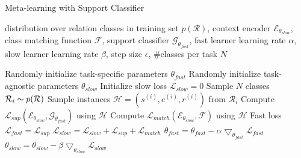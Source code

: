 \begin{algorithm}[th]
\small
\caption{Meta-learning with Support Classifier}\label{alg:metal}
distribution over relation classes in training set $p(\mathcal{R})$,
context encoder $\mathcal{E}_{\theta_{slow}}$,
class matching function $\mathcal{F}$,
support classifier $\mathcal{G}_{\theta_{fast}}$,
fast learner learning rate $\alpha$,
slow learner learning rate $\beta$,
step size $\epsilon$, \#classes per task $N$
\begin{algorithmic}[1]
\STATE Randomly initialize task-specific parameters $\theta_{fast}$
\STATE Randomly initialize task-agnostic parameters $\theta_{slow}$
\STATE Initialize slow loss $\mathcal{L}_{slow}=0$
\STATE Sample $N$ classes $\mathcal{R}_i \thicksim p(\mathcal{R})$
\label{sampler}
\STATE Sample instances $\mathcal{H}=(s^{(i)}, e^{(i)}, r^{(i)})$ from $\mathcal{R}_i$
\label{samplei}
\STATE Compute $\mathcal{L}_{sup}(\mathcal{E}_{\theta_{slow}}, \mathcal{G}_{\theta_{fast}})$ using $\mathcal{H}$
\label{Lsup}
\STATE Compute $\mathcal{L}_{match}(\mathcal{E}_{\theta_{slow}}, \mathcal{F})$ using $\mathcal{H}$
\STATE Fast loss $\mathcal{L}_{fast}=\mathcal{L}_{sup}$
\label{fastloss}
\STATE $\mathcal{L}_{slow} = \mathcal{L}_{slow} + \mathcal{L}_{sup} + \mathcal{L}_{match}$
\label{slowloss}
\STATE $\theta_{fast} = \theta_{fast} - \alpha \bigtriangledown_{\theta_{fast}} \mathcal{L}_{fast}$
\label{fast}
\ENDFOR
\STATE $\theta_{slow} = \theta_{slow} - \beta \bigtriangledown_{\theta_{slow}} \mathcal{L}_{slow}$
\label{slow}
\ENDWHILE
\end{algorithmic}
\end{algorithm}

